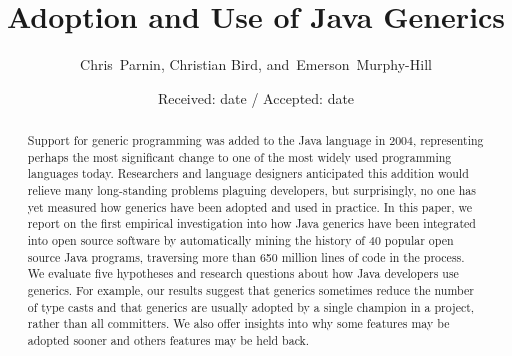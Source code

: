 \documentclass{svjour3}
\begin{document}

\title{Adoption and Use of Java Generics}


\author{Chris~Parnin,
		Christian Bird,
        and~Emerson~Murphy-Hill}


\date{Received: date / Accepted: date}

\maketitle

\begin{abstract}
Support for generic programming was added to the Java language in 2004,
representing perhaps the most significant change to one of the most widely used
programming languages today. 
Researchers and language designers anticipated this addition would relieve
many long-standing problems plaguing developers, but
surprisingly, no one has yet measured how generics have been adopted and used in practice.
In this paper, we report on the first empirical investigation into how Java
generics have been integrated into open source software by automatically
mining the history of 40 popular open source Java programs,
traversing more than 650 million lines of code in the process.
We evaluate five hypotheses and research questions about how Java developers use generics.
For example, our results suggest 
that generics sometimes reduce the number of type casts and
that generics are usually adopted by a single champion in a project,
rather than all committers.  We also offer insights into why some features may be adopted sooner 
and others features may be held back.
\end{abstract}
\end{document}
